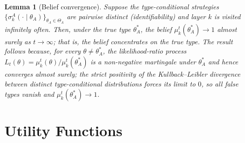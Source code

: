 \documentclass[conference]{IEEEtran}
\newtheorem{lemma}{Lemma}
\begin{document}
\begin{lemma}[Belief convergence]
\label{lem:belief}
Suppose the type-conditional strategies
$\{\sigma_k^A(\cdot\mid\theta_A)\}_{\theta_A\in\Theta_A}$ are pairwise distinct
(\emph{identifiability}) and layer $k$ is visited infinitely often. Then, under
the true type $\theta_A^*$, the belief $\mu_k^t(\theta_A^*)\to 1$ almost surely
as $t\to\infty$; that is, the belief concentrates on the true type. The result
follows because, for every $\theta\neq\theta_A^*$, the likelihood-ratio process
$L_t(\theta)=\mu_k^t(\theta)/\mu_k^t(\theta_A^*)$ is a non-negative martingale
under $\theta_A^*$ and hence converges almost surely; the strict positivity of
the Kullback--Leibler divergence between distinct type-conditional
distributions forces its limit to $0$, so all false types vanish and
$\mu_k^t(\theta_A^*)\to 1$.
\end{lemma}

\section{Utility Functions}
\label{sec:utilities}
\end{document}
